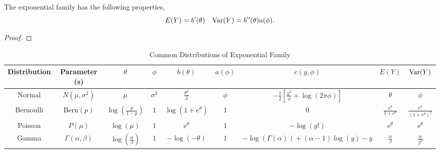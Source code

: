 \begin{property}
	The exponential family has the following properties,
	\begin{equation*}
		E(Y)=b^{\prime}(\theta)\quad\mathrm{Var}(Y)=b^{\prime\prime}(\theta)a(\phi).
	\end{equation*}
\end{property}

\begin{proof}

\end{proof}

\begin{landscape}
	\begin{table}[hpt]
		\centering
		\caption{Common Distributions of Exponential Family}
		\begin{tabular}{ccccccccc}
			\toprule
			Distribution & Parameter (s)            & \(\theta\)                                & \(\phi\)       & \(b(\theta)\)                     & \(a(\phi)\) & \(c(y,\phi)\)                                                   & \(E(Y)\)                            & \(\mathrm{Var}(Y)\)                                          \\
			\midrule
			Normal       & \(N(\mu,\sigma^2)\)      & \(\mu\)                                   & \(\sigma^{2}\) & \(\frac{\theta^{2}}{2}\)          & \(\phi\)    & \(-\frac{1}{2}\left[\frac{y^{2}}{\phi}+\log (2\pi\phi)\right]\) & \(\theta\)                          & \(\phi\)                                             \\
			Bernoulli    & \(\text{Bern}(p)\)       & \(\log\left(\frac{p}{1-p}\right)\)        & \(1\)          & \(\log\left(1+e^{\theta}\right)\) & \(1\)       & \(0\)                                                           & \(\frac{e^{\theta}}{1+e^{\theta}}\) & \(\frac{e^{\theta}}{\left(1+e^{\theta}\right)^{2}}\) \\
			Poisson      & \(P(\mu)\)               & \(\log(\mu)\)                             & \(1\)          & \(\mathrm{e}^{\theta}\)           & \(1\)       & \(-\log(y!)\)                                                   & \(\mathrm{e}^{\theta}\)             & \(\mathrm{e}^{\theta}\)                              \\
			Gamma        & \(\Gamma(\alpha,\beta)\) & \(\log\left(\frac{\alpha}{\beta}\right)\) & \(1\)          & \(-\log(-\theta)\)                & \(1\)       & \(-\log\left(\Gamma(\alpha)\right)+(\alpha-1)\log(y)-y\)        & \(\frac{\alpha}{\beta}\)            & \(\frac{\alpha}{\beta^{2}}\)                         \\
			\bottomrule
		\end{tabular}
	\end{table}
\end{landscape}

